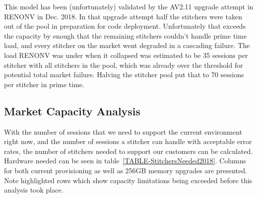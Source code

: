 \documentclass{article}
\begin{document}
This model has been (unfortunately) validated by the AV2.11 upgrade attempt in RENONV in Dec. 2018. In that upgrade attempt half the stitchers were taken out of the pool in preparation for code deployment. Unfortunately that exceeds the capacity by enough that the remaining stitchers couldn't handle prime time load, and every stitcher on the market went degraded in a cascading failure. The load RENONV was under when it collapsed was estimated to be 35 sessions per stitcher with all stitchers in the pool, which was already over the threshold for potential total market failure. Halving the stitcher pool put that to 70 sessions per stitcher in prime time. 

\subsection{Market Capacity Analysis}
\label{SECTION-MarketCapacity}

With the number of sessions that we need to support the current environment right now, and the number of sessions a stitcher can handle with acceptable error rates, the number of stitchers needed to support our customers can be calculated. Hardware needed can be seen in table~\ref{TABLE-StitchersNeeded2018}. Columns for both current provisioning as well as 256GB memory upgrades are presented. Note highlighted rows which show capacity limitations being exceeded before this analysis took place. 
\end{document}

